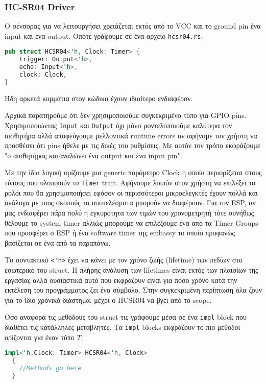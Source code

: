 \subsubsection{HC-SR04 Driver}

Ο σένσορας για να λειτουργήσει χρειάζεται εκτός από το VCC και το ground pin
ένα input και ένα output. Οπότε γράφουμε σε ένα αρχείο \verb|hcsr04.rs|:

\begin{lstlisting}[language=Rust]
pub struct HCSR04<'h, Clock: Timer> {
    trigger: Output<'h>,
    echo: Input<'h>,
    clock: Clock,
}
\end{lstlisting}

Ήδη αρκετά κομμάτια στον κώδικα έχουν ιδιαίτερο ενδιαφέρον.

Αρχικά παρατηρούμε ότι δεν χρησιμοποιούμε συγκεκριμένο τύπο για
GPIO pins. Χρησιμοποιώντας \verb|Input| και \verb|Output| όχι μόνο
μοντελοποιούμε καλύτερα τον αισθητήρα αλλά αποφεύγουμε μελλοντικά
runtime errors αν αφήναμε τον χρήστη να προσθέσει ότι pins ήθελε με
τις δικές του ρυθμίσεις. Με αυτόν τον τρόπο εκφράζουμε "ο αισθητήρας καταναλώνει
ένα output και ένα input pin".

Με την ίδια λογική ορίζουμε μια generic παράμετρο Clock η οποία περιορίζεται
στους τύπους που υλοποιούν το \verb|Timer| trait. Αφήνουμε λοιπόν στον
χρήστη να επιλέξει το ρολόι που θα χρησιμοποιήσει εφόσον οι περισσότεροι
μικροελεγκτές έχουν πολλά και ανάλογα με τους σκοπούς τα αποτελέσματα
μπορούν να διαφέρουν. Για τον ESP, αν μας ενδιαφέρει πάρα πολύ η εγκυρότητα των τιμών
του χρονομετρητή τότε συνήθως θέλουμε το system timer αλλιώς μπορούμε να επιλέξουμε
ένα από τα Timer Groups που προσφέρει ο ESP ή ένα software timer της embassy το οποίο
προφανώς βασίζεται σε ένα από τα παραπάνω.

Το συντακτικό \verb|<'h>| έχει να κάνει με τον χρόνο ζωής (lifetime)
των πεδίων στο εσωτερικό του struct. Η πλήρης ανάλυση των lifetimes
είναι εκτός των πλαισίων της εργασίας αλλά ουσιαστικά αυτό που
εκφράζουν είναι για πόσο χρόνο κατά την εκτέλεση του προγράμματος ζει
ένα σύμβολο. Στην συγκεκριμένη περίπτωση όλα ζουν για το ίδιο χρόνικό
διάστημα, μέχρι ο HCSR04 να βγει από το scope.

Όσο αναφορά τις μεθόδους του struct τις γράφουμε μέσα σε ένα \verb|impl|
block που διαθέτει τις κατάλληλες μεταβλητές. Τα \verb|impl| blocks εκφράζουν
το πιο μέθοδοι ορίζονται για έναν τύπο $T$.

\begin{lstlisting}[language=Rust]
  impl<'h,Clock: Timer> HCSR04<'h, Clock>
  {
    //Methods go here
  }
\end{lstlisting}

